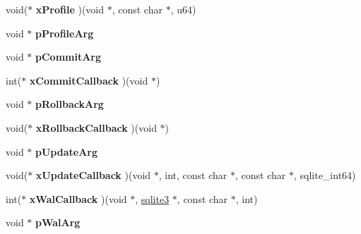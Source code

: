 \begin{DoxyCompactItemize}
\item 
\hypertarget{structsqlite3_aa02bf4f3ffdaf52d43a3668661903ffb}{void($\ast$ {\bfseries x\-Profile} )(void $\ast$, const char $\ast$, u64)}\label{structsqlite3_aa02bf4f3ffdaf52d43a3668661903ffb}

\item 
\hypertarget{structsqlite3_a931c234df9b701c78de38ddf22869062}{void $\ast$ {\bfseries p\-Profile\-Arg}}\label{structsqlite3_a931c234df9b701c78de38ddf22869062}

\item 
\hypertarget{structsqlite3_a355237725d3a535d702815b6ef8be75e}{void $\ast$ {\bfseries p\-Commit\-Arg}}\label{structsqlite3_a355237725d3a535d702815b6ef8be75e}

\item 
\hypertarget{structsqlite3_a1b12d797fb7f9c526ffb6665a7f42203}{int($\ast$ {\bfseries x\-Commit\-Callback} )(void $\ast$)}\label{structsqlite3_a1b12d797fb7f9c526ffb6665a7f42203}

\item 
\hypertarget{structsqlite3_a3215967241f15d4599132a8dc2adfb93}{void $\ast$ {\bfseries p\-Rollback\-Arg}}\label{structsqlite3_a3215967241f15d4599132a8dc2adfb93}

\item 
\hypertarget{structsqlite3_ad09cbc96e3c4e322c1722b8c16b9cf24}{void($\ast$ {\bfseries x\-Rollback\-Callback} )(void $\ast$)}\label{structsqlite3_ad09cbc96e3c4e322c1722b8c16b9cf24}

\item 
\hypertarget{structsqlite3_ab4269aa44fea9906fe94045336f13d2a}{void $\ast$ {\bfseries p\-Update\-Arg}}\label{structsqlite3_ab4269aa44fea9906fe94045336f13d2a}

\item 
\hypertarget{structsqlite3_a9177ce33e670ba38c97046e21482414a}{void($\ast$ {\bfseries x\-Update\-Callback} )(void $\ast$, int, const char $\ast$, const char $\ast$, sqlite\-\_\-int64)}\label{structsqlite3_a9177ce33e670ba38c97046e21482414a}

\item 
\hypertarget{structsqlite3_a895ca1f1d541060f1a43ac0267ab6437}{int($\ast$ {\bfseries x\-Wal\-Callback} )(void $\ast$, \hyperlink{structsqlite3}{sqlite3} $\ast$, const char $\ast$, int)}\label{structsqlite3_a895ca1f1d541060f1a43ac0267ab6437}

\item 
\hypertarget{structsqlite3_aa75309c2e522cf0f6ccbd7a3c38e1075}{void $\ast$ {\bfseries p\-Wal\-Arg}}\label{structsqlite3_aa75309c2e522cf0f6ccbd7a3c38e1075}


\end{DoxyCompactItemize}
